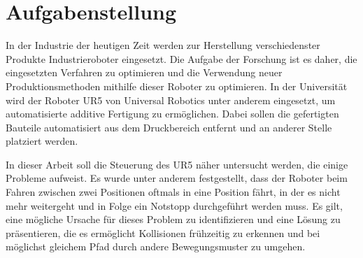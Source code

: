 \chapter*{Aufgabenstellung}

In der Industrie der heutigen Zeit werden zur Herstellung verschiedenster Produkte Industrieroboter eingesetzt.
Die Aufgabe der Forschung ist es daher, die eingesetzten Verfahren zu optimieren und die Verwendung neuer Produktionsmethoden mithilfe dieser Roboter zu optimieren.
In der Universität wird der Roboter UR5 von Universal Robotics unter anderem eingesetzt, um automatisierte additive Fertigung zu ermöglichen.
Dabei sollen die gefertigten Bauteile automatisiert aus dem Druckbereich entfernt und an anderer Stelle platziert werden.

In dieser Arbeit soll die Steuerung des UR5 näher untersucht werden, die einige Probleme aufweist.
Es wurde unter anderem festgestellt, dass der Roboter beim Fahren zwischen zwei Positionen oftmals in eine Position fährt, in der es nicht mehr weitergeht und in Folge ein Notstopp durchgeführt werden muss.
Es gilt, eine mögliche Ursache für dieses Problem zu identifizieren und eine Lösung zu präsentieren, die es ermöglicht Kollisionen frühzeitig zu erkennen und bei möglichst gleichem Pfad durch andere Bewegungsmuster zu umgehen.